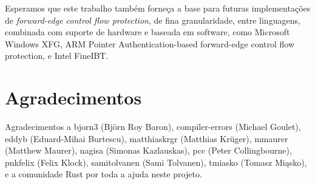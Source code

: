 \documentclass{article}
\begin{document}
Esperamos que este trabalho também forneça a base para futuras implementações de \textit{forward-edge control flow protection}, de fina granularidade, entre linguagens, combinada com suporte de hardware e baseada em software, como Microsoft Windows XFG, ARM Pointer Authentication-based forward-edge control flow protection, e Intel FineIBT.


\section{Agradecimentos}

Agradecimentos a bjorn3 (Björn Roy Baron), compiler-errors (Michael Goulet), eddyb (Eduard-Mihai Burtescu), matthiaskrgr (Matthias Krüger), mmaurer (Matthew Maurer), nagisa (Simonas Kazlauskas), pcc (Peter Collingbourne), pnkfelix (Felix Klock), samitolvanen (Sami Tolvanen), tmiasko (Tomasz Miąsko), e a comunidade Rust por toda a ajuda neste projeto.
\end{document}
